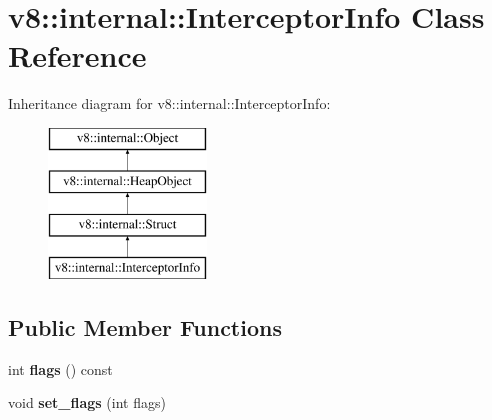 \hypertarget{classv8_1_1internal_1_1_interceptor_info}{}\section{v8\+:\+:internal\+:\+:Interceptor\+Info Class Reference}
\label{classv8_1_1internal_1_1_interceptor_info}
Inheritance diagram for v8\+:\+:internal\+:\+:Interceptor\+Info\+:\begin{figure}[H]
\begin{center}
\leavevmode
\includegraphics[height=4.000000cm]{classv8_1_1internal_1_1_interceptor_info}
\end{center}
\end{figure}
\subsection*{Public Member Functions}
\begin{DoxyCompactItemize}
\item 
int {\bfseries flags} () const \hypertarget{classv8_1_1internal_1_1_interceptor_info_a7aaafe50958b0fc56c005efe4fdba852}{}\label{classv8_1_1internal_1_1_interceptor_info_a7aaafe50958b0fc56c005efe4fdba852}

\item 
void {\bfseries set\+\_\+flags} (int flags)\hypertarget{classv8_1_1internal_1_1_interceptor_info_a80e31ead607eb711c56310bfa131a87b}{}\label{classv8_1_1internal_1_1_interceptor_info_a80e31ead607eb711c56310bfa131a87b}

\end{DoxyCompactItemize}
